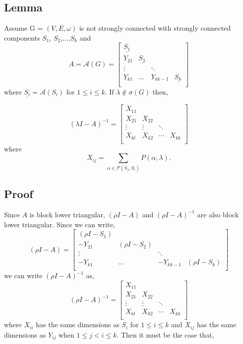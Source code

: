 \documentclass{paper}
\begin{document}
\subsection*{Lemma}
Assume G = $(V,E,\omega)$ is not strongly connected with strongly connected components $S_1$, $S_2$,...,$S_k$ and 
\[
A = 
\mathcal{A}(G) =
\begin{bmatrix}
\underline{S_1} \\
Y_{21} & \underline{S_2} \\
\vdots & & \ddots \\
Y_{k1} & \hdots & Y_{kk-1} & \underline{S_k} \\
\end{bmatrix}
\] where $\underline{S_i}= \mathcal{A}(S_i)$ for $1 \leq i \leq k$. If $\lambda \notin \sigma(G)$ then,

\[
(\lambda I - A)^{-1} = 
\begin{bmatrix}
X_{11} \\
X_{21} & X_{22} \\
\vdots & \vdots & \ddots \\
X_{kl} & X_{k2} & \cdots & X_{kk} \\
\end{bmatrix}
\]
where
\[ X_{ij} = \sum_{\alpha \in \mathcal{P}(S_j,S_i)} P(\alpha,\lambda). \]

\subsection*{Proof}

Since $A$ is block lower triangular, $(\rho I -A)$ and $(\rho I - A)^{-1}$ are also block lower triangular. Since we can write,
\[
(\rho I - A)
=
\begin{bmatrix}
(\rho I - S_1) \\
-Y_{21} & (\rho I - S_2) \\
\vdots & & \ddots \\
-Y_{k1} & \hdots & -Y_{kk-1} & (\rho I - S_k) \\
\end{bmatrix}
\]
we can write $(\rho I - A)^{-1}$ as,
\[
(\rho I - A)^{-1} = 
\begin{bmatrix}
X_{11} \\
X_{21} & X_{22} \\
\vdots & \vdots & \ddots \\
X_{kl} & X_{k2} & \cdots & X_{kk} \\
\end{bmatrix}
\]
where $X_{ii}$ has the same dimensions as $S_i$ for $1 \leq i \leq k$ and $X_{ij}$ has the same dimensions as $Y_{ij}$ when $1 \leq j < i \leq k$. Then it must be the case that,
\end{document}
